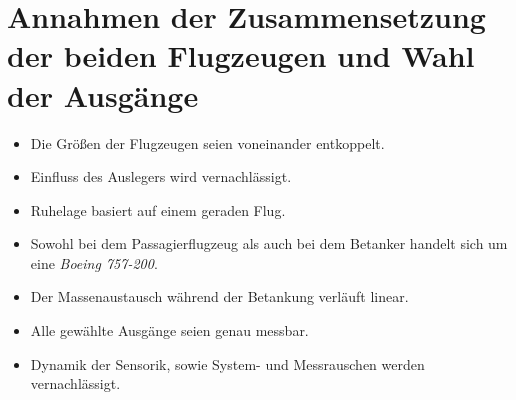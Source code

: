 \section{Annahmen der Zusammensetzung der beiden Flugzeugen und Wahl der Ausgänge} 
\begin{itemize}
\item Die Grö{\ss}en der Flugzeugen seien voneinander entkoppelt.
\item Einfluss des Auslegers wird vernachlässigt.
\item Ruhelage basiert  auf einem geraden Flug.
\item Sowohl bei dem Passagierflugzeug als auch bei dem Betanker handelt sich um eine \textit{Boeing 757-200}.
\item Der Massenaustausch während der Betankung verläuft linear.
\item Alle gewählte Ausgänge seien genau messbar.
\item Dynamik der Sensorik, sowie System- und Messrauschen werden vernachlässigt. 
\end{itemize}
